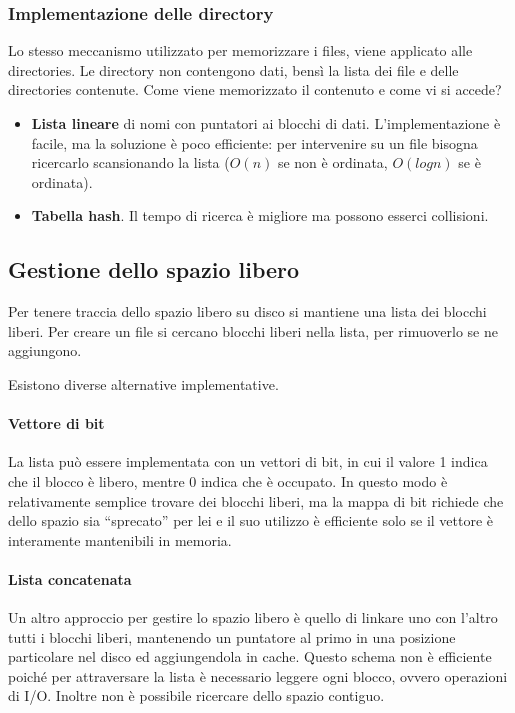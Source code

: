 \documentclass[a4]{article}
\begin{document}
\subsubsection{Implementazione delle directory}
Lo stesso meccanismo utilizzato per memorizzare i files, viene applicato alle directories. Le directory non contengono dati, bensì la lista dei file e delle directories contenute. Come viene memorizzato il contenuto e come vi si accede?
\begin{itemize}
    \item \textbf{Lista lineare} di nomi con puntatori ai blocchi di dati. L'implementazione è facile, ma la soluzione è poco efficiente: per intervenire su un file bisogna ricercarlo scansionando la lista ($O(n)$ se non è ordinata, $O(log n)$ se è ordinata).
    \item \textbf{Tabella hash}. Il tempo di ricerca è migliore ma possono esserci collisioni.
\end{itemize}

\subsection{Gestione dello spazio libero}

Per tenere traccia dello spazio libero su disco si mantiene una lista dei blocchi liberi. Per creare un file si cercano blocchi liberi nella lista, per rimuoverlo se ne aggiungono.

Esistono diverse alternative implementative.

\paragraph{Vettore di bit}
La lista può essere implementata con un vettori di bit, in cui il valore 1 indica che il blocco è libero, mentre 0 indica che è occupato. In questo modo è relativamente semplice trovare dei blocchi liberi, ma la mappa di bit richiede che dello spazio sia ``sprecato'' per lei e il suo utilizzo è efficiente solo se il vettore è interamente mantenibili in memoria.

\paragraph{Lista concatenata}
Un altro approccio per gestire lo spazio libero è quello di linkare uno con l'altro tutti i blocchi liberi, mantenendo un puntatore al primo in una posizione particolare nel disco ed aggiungendola in cache. Questo schema non è efficiente poiché per attraversare la lista è necessario leggere ogni blocco, ovvero operazioni di I/O. Inoltre non è possibile ricercare dello spazio contiguo.
\end{document}
